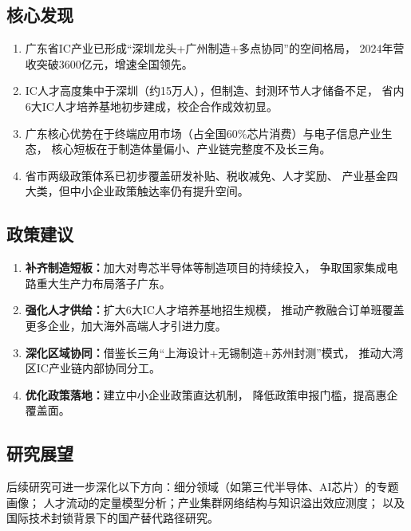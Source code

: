 \documentclass[12pt,a4paper]{ctexart}
\begin{document}
\subsection{核心发现}
\label{sec:findings}

\begin{enumerate}[label=(\arabic*)]
    \item 广东省IC产业已形成“深圳龙头+广州制造+多点协同”的空间格局，
          2024年营收突破3600亿元，增速全国领先。
    \item IC人才高度集中于深圳（约15万人），但制造、封测环节人才储备不足，
          省内6大IC人才培养基地初步建成，校企合作成效初显。
    \item 广东核心优势在于终端应用市场（占全国60\%芯片消费）与电子信息产业生态，
          核心短板在于制造体量偏小、产业链完整度不及长三角。
    \item 省市两级政策体系已初步覆盖研发补贴、税收减免、人才奖励、
          产业基金四大类，但中小企业政策触达率仍有提升空间。
\end{enumerate}

\subsection{政策建议}
\label{sec:recommendations}

\begin{enumerate}[label=(\arabic*)]
    \item \textbf{补齐制造短板：}加大对粤芯半导体等制造项目的持续投入，
          争取国家集成电路重大生产力布局落子广东。
    \item \textbf{强化人才供给：}扩大6大IC人才培养基地招生规模，
          推动产教融合订单班覆盖更多企业，加大海外高端人才引进力度。
    \item \textbf{深化区域协同：}借鉴长三角“上海设计+无锡制造+苏州封测”模式，
          推动大湾区IC产业链内部协同分工。
    \item \textbf{优化政策落地：}建立中小企业政策直达机制，
          降低政策申报门槛，提高惠企覆盖面。
\end{enumerate}

\subsection{研究展望}
\label{sec:outlook}

后续研究可进一步深化以下方向：细分领域（如第三代半导体、AI芯片）的专题画像；
人才流动的定量模型分析；产业集群网络结构与知识溢出效应测度；
以及国际技术封锁背景下的国产替代路径研究。
\end{document}
